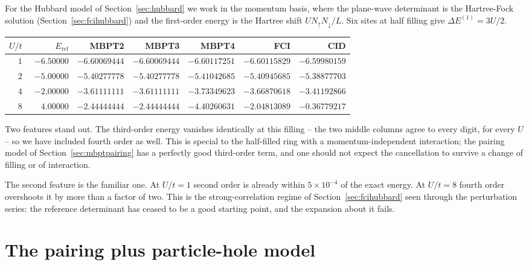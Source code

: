 For the Hubbard model of Section~\ref{sec:hubbard} we work in the momentum
basis, where the plane-wave determinant is the Hartree-Fock solution
(Section~\ref{sec:fcihubbard}) and the first-order energy is the Hartree shift
$UN_{\uparrow}N_{\downarrow}/L$.  Six sites at half filling give
$\Delta E^{(1)}=3U/2$.

\begin{center}
\renewcommand{\arraystretch}{1.2}
\setlength{\tabcolsep}{6pt}
\small
\begin{tabular}{rrrrrrr}
\toprule
$U/t$ & $E_{\mathrm{ref}}$ & MBPT2 & MBPT3 & MBPT4 & FCI & CID\\
\midrule
$1$ & $-6.50000$ & $-6.60069444$ & $-6.60069444$ & $-6.60117251$
  & $-6.60115829$ & $-6.59980159$\\
$2$ & $-5.00000$ & $-5.40277778$ & $-5.40277778$ & $-5.41042685$
  & $-5.40945685$ & $-5.38877703$\\
$4$ & $-2.00000$ & $-3.61111111$ & $-3.61111111$ & $-3.73349623$
  & $-3.66870618$ & $-3.41192866$\\
$8$ & $\phantom{-}4.00000$ & $-2.44444444$ & $-2.44444444$
  & $-4.40260631$ & $-2.04813089$ & $-0.36779217$\\
\bottomrule
\end{tabular}
\end{center}

Two features stand out.  The third-order energy vanishes identically at this
filling -- the two middle columns agree to every digit, for every $U$ -- so we
have included fourth order as well.  This is special to the half-filled ring
with a momentum-independent interaction; the pairing model of
Section~\ref{sec:mbptpairing} has a perfectly good third-order term, and one
should not expect the cancellation to survive a change of filling or of
interaction.

The second feature is the familiar one.  At $U/t=1$ second order is already
within $5\times10^{-4}$ of the exact energy.  At $U/t=8$ fourth order
overshoots it by more than a factor of two.  This is the strong-correlation
regime of Section~\ref{sec:fcihubbard} seen through the perturbation series:
the reference determinant has ceased to be a good starting point, and the
expansion about it fails.

\section{The pairing plus particle-hole model}
\label{sec:mbptpairingph}

